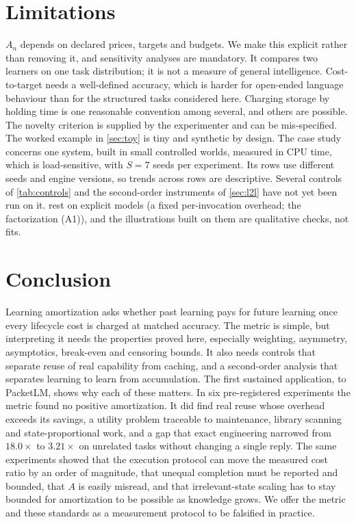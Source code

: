 \documentclass[11pt]{article}
\theoremstyle{remark}
\begin{document}
\section{Limitations}
$A_n$ depends on declared prices, targets and budgets. We make this explicit rather than removing it, and sensitivity analyses are mandatory.
It compares two learners on one task distribution; it is not a measure of general intelligence.
Cost-to-target needs a well-defined accuracy, which is harder for open-ended language behaviour than for the structured tasks considered here.
Charging storage by holding time is one reasonable convention among several, and others are possible.
The novelty criterion is supplied by the experimenter and can be mis-specified.
The worked example in \cref{sec:toy} is tiny and synthetic by design.
The case study concerns one system, built in small controlled worlds, measured in CPU time, which is load-sensitive, with $S=7$ seeds per experiment. Its rows use different seeds and engine versions, so trends across rows are descriptive. Several controls of \cref{tab:controls} and the second-order instruments of \cref{sec:l2l} have not yet been run on it.
 rest on explicit models (a fixed per-invocation overhead; the factorization (A1)), and the illustrations built on them are qualitative checks, not fits.

\section{Conclusion}
Learning amortization asks whether past learning pays for future learning once every lifecycle cost is charged at matched accuracy.
The metric is simple, but interpreting it needs the properties proved here, especially weighting, asymmetry, asymptotics, break-even and censoring bounds.
It also needs controls that separate reuse of real capability from caching, and a second-order analysis that separates learning to learn from accumulation.
The first sustained application, to PacketLM, shows why each of these matters.
In six pre-registered experiments the metric found no positive amortization. It did find real reuse whose overhead exceeds its savings, a utility problem traceable to maintenance, library scanning and state-proportional work, and a gap that exact engineering narrowed from $18.0\times$ to $3.21\times$ on unrelated tasks without changing a single reply.
The same experiments showed that the execution protocol can move the measured cost ratio by an order of magnitude, that unequal completion must be reported and bounded, that $A$ is easily misread, and that irrelevant-state scaling has to stay bounded for amortization to be possible as knowledge grows.
We offer the metric and these standards as a measurement protocol to be falsified in practice.
\end{document}
